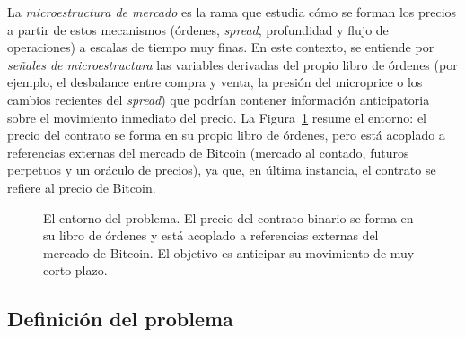 La \emph{microestructura de mercado} es la rama que estudia cómo se forman los precios a
partir de estos mecanismos (órdenes, \emph{spread}, profundidad y flujo de
operaciones) a escalas de tiempo muy finas. En este contexto, se entiende por
\emph{señales de microestructura} las variables derivadas del propio libro de órdenes (por
ejemplo, el desbalance entre compra y venta, la presión del microprice o los cambios
recientes del \emph{spread}) que podrían contener información anticipatoria sobre el
movimiento inmediato del precio. La Figura~\ref{fig:mercado} resume el entorno: el precio del
contrato se forma en su propio libro de órdenes, pero está acoplado a referencias externas
del mercado de Bitcoin (mercado al contado, futuros perpetuos y un oráculo de precios), ya
que, en última instancia, el contrato se refiere al precio de Bitcoin.

\begin{figure}[h]
\centering
{}
\caption{El entorno del problema. El precio del contrato binario se forma en su libro de
órdenes y está acoplado a referencias externas del mercado de Bitcoin. El objetivo es
anticipar su movimiento de muy corto plazo.}
\label{fig:mercado}
\end{figure}

\subsection{Definición del problema}

